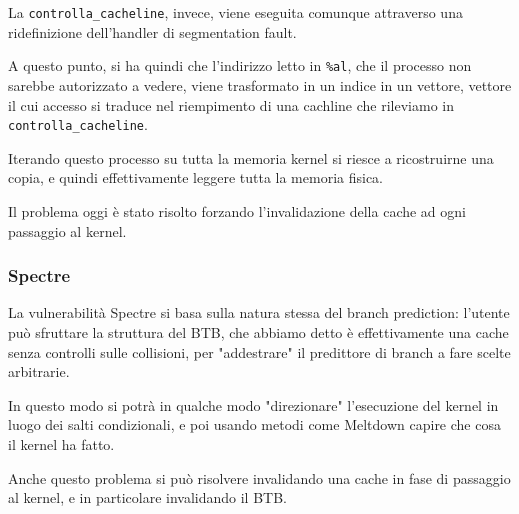 \documentclass[a4paper,11pt]{article}
\begin{document}
La \lstinline|controlla_cacheline|, invece, viene eseguita comunque attraverso una ridefinizione dell'handler di segmentation fault.

A questo punto, si ha quindi che l'indirizzo letto in \lstinline|%al|, che il processo non sarebbe autorizzato a vedere, viene trasformato in un indice in un vettore, vettore il cui accesso si traduce nel riempimento di una cachline che rileviamo in \lstinline|controlla_cacheline|.

Iterando questo processo su tutta la memoria kernel si riesce a ricostruirne una copia, e quindi effettivamente leggere tutta la memoria fisica.

Il problema oggi è stato risolto forzando l'invalidazione della cache ad ogni passaggio al kernel.

\subsubsection{Spectre}
La vulnerabilità Spectre si basa sulla natura stessa del branch prediction: l'utente può sfruttare la struttura del BTB, che abbiamo detto è effettivamente una cache senza controlli sulle collisioni, per "addestrare" il predittore di branch a fare scelte arbitrarie.

In questo modo si potrà in qualche modo "direzionare" l'esecuzione del kernel in luogo dei salti condizionali, e poi usando metodi come Meltdown capire che cosa il kernel ha fatto.

Anche questo problema si può risolvere invalidando una cache in fase di passaggio al kernel, e in particolare invalidando il BTB.
\end{document}

